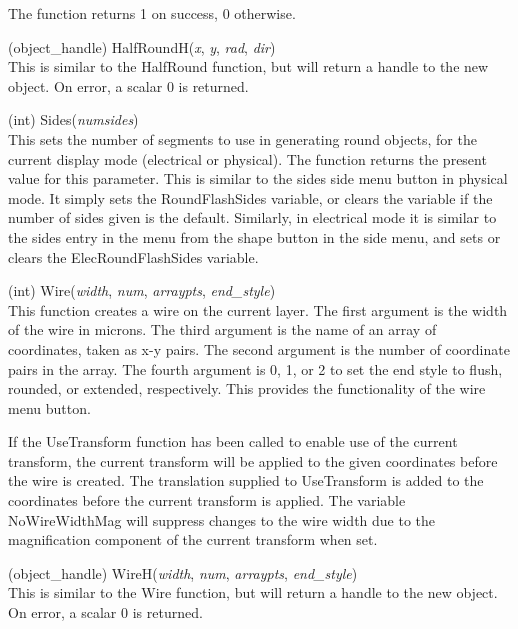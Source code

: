 \begin{description}
The function returns 1 on success, 0 otherwise.

\item{(object\_handle) \vt HalfRoundH({\it x\/}, {\it y\/}, {\it rad\/},
 {\it dir\/})}\\
This is similar to the {\vt HalfRound} function, but will return a
handle to the new object.  On error, a scalar 0 is returned.

\item{(int) \vt Sides({\it numsides\/})}\\
This sets the number of segments to use in generating round objects,
for the current display mode (electrical or physical).  The function
returns the present value for this parameter.  This is similar to the
{\cb sides} side menu button in physical mode.  It simply sets the
{\et RoundFlashSides} variable, or clears the variable if the number
of sides given is the default.  Similarly, in electrical mode it is
similar to the {\cb sides} entry in the menu from the {\cb shape}
button in the side menu, and sets or clears the {\et
ElecRoundFlashSides} variable.

\item{(int) \vt Wire({\it width\/}, {\it num\/}, {\it arraypts\/},
 {\it end\_style\/})}\\
This function creates a wire on the current layer.  The first argument
is the width of the wire in microns.  The third argument is the name
of an array of coordinates, taken as x-y pairs.  The second argument
is the number of coordinate pairs in the array.  The fourth argument
is 0, 1, or 2 to set the end style to flush, rounded, or extended,
respectively.  This provides the functionality of the {\cb wire} menu
button.

If the {\vt UseTransform} function has been called to enable use of
the current transform, the current transform will be applied to the
given coordinates before the wire is created.  The translation
supplied to {\vt UseTransform} is added to the coordinates before the
current transform is applied.  The variable {\et NoWireWidthMag} will
suppress changes to the wire width due to the magnification component
of the current transform when set.

\item{(object\_handle) \vt WireH({\it width\/}, {\it num\/}, {\it arraypts\/},
 {\it end\_style\/})}\\
This is similar to the {\vt Wire} function, but will return a handle
to the new object.  On error, a scalar 0 is returned.


\end{description}
